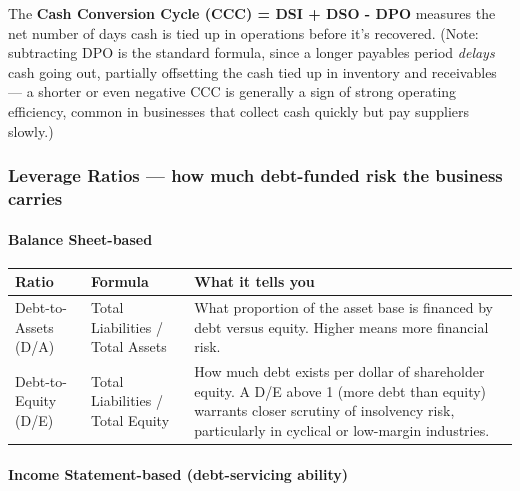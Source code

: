 \documentclass[12pt,openany]{book}
\begin{document}
The \textbf{Cash Conversion Cycle (CCC) = DSI + DSO - DPO} measures the net number of days cash is tied up in operations before it's recovered. (Note: subtracting DPO is the standard formula, since a longer payables period \emph{delays} cash going out, partially offsetting the cash tied up in inventory and receivables --- a shorter or even negative CCC is generally a sign of strong operating efficiency, common in businesses that collect cash quickly but pay suppliers slowly.)

\subsubsection{Leverage Ratios --- how much debt-funded risk the business carries}

\paragraph{Balance Sheet-based} 

\begingroup
\small
\setlength{\tabcolsep}{4pt}
\begin{center}\begin{tabular}{|L{0.22\textwidth}|L{0.24\textwidth}|L{0.42\textwidth}|}
\hline
\textbf{Ratio} & \textbf{Formula} & \textbf{What it tells you} \\
\hline
Debt-to-Assets (D/A) & Total Liabilities / Total Assets & What proportion of the asset base is financed by debt versus equity. Higher means more financial risk. \\
\hline
Debt-to-Equity (D/E) & Total Liabilities / Total Equity & How much debt exists per dollar of shareholder equity. A D/E above 1 (more debt than equity) warrants closer scrutiny of insolvency risk, particularly in cyclical or low-margin industries. \\
\hline
\end{tabular}\end{center}
\endgroup

\paragraph{Income Statement-based (debt-servicing ability)} 
\end{document}
